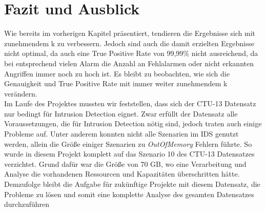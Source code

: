 \documentclass[main.tex]{subfiles}
\author{Philipp Nickel}
\begin{document}
\section{Fazit und Ausblick}
Wie bereits im vorherigen Kapitel präsentiert, tendieren die Ergebnisse sich mit zunehmendem k zu verbessern. Jedoch sind auch die damit erzielten Ergebnisse nicht optimal, da auch eine True Positive Rate von 99,99\% nicht ausreichend, da  bei entsprechend vielen Alarm die Anzahl an Fehlalarmen oder nicht erkannten Angriffen immer noch zu hoch ist. Es bleibt zu beobachten, wie sich die Genauigkeit und True Positive Rate mit immer weiter zunehmendem k verändern.  
\\
Im Laufe des Projektes mussten wir feststellen, dass sich der CTU-13 Datensatz nur bedingt für Intrusion Detection eignet. Zwar erfüllt der Datensatz alle Voraussetzungen, die für Intrusion Detection nötig sind, jedoch traten auch einige Probleme auf. Unter anderem konnten nicht alle Szenarien im IDS genutzt werden, allein die Größe einiger Szenarien zu \textit{OutOfMemory} Fehlern führte. So wurde in diesem Projekt komplett auf das Szenario 10 des CTU-13 Datensatzes verzichtet. Grund dafür war die Größe von 70 GB, wo eine Verarbeitung und Analyse die vorhandenen Ressourcen und Kapazitäten überschritten hätte.
\\
Demzufolge bleibt die Aufgabe für zukünftige Projekte mit diesem Datensatz, die Probleme zu lösen und somit eine komplette Analyse des gesamten Datensatzes durchzuführen    
\end{document}
